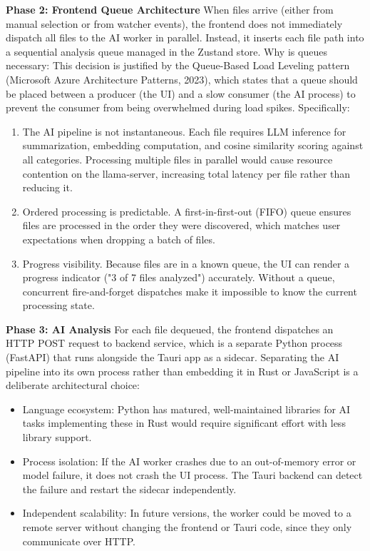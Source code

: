 \documentclass[12pt,oneside,openright,a4paper]{cpe-english-project}
\begin{document}
\textbf{Phase 2: Frontend Queue Architecture}
When files arrive (either from manual selection or from watcher events), the frontend does not immediately dispatch all files to the AI worker in parallel. Instead, it inserts each file path into a sequential analysis queue managed in the Zustand store.
Why is queues necessary:
This decision is justified by the Queue-Based Load Leveling pattern (Microsoft Azure Architecture Patterns, 2023), which states that a queue should be placed between a producer (the UI) and a slow consumer (the AI process) to prevent the consumer from being overwhelmed during load spikes. Specifically:
\begin{enumerate}[label=\arabic*.,leftmargin=0.6in]
\item The AI pipeline is not instantaneous. Each file requires LLM inference for summarization, embedding computation, and cosine similarity scoring against all categories. Processing multiple files in parallel would cause resource contention on the llama-server, increasing total latency per file rather than reducing it.
\item Ordered processing is predictable. A first-in-first-out (FIFO) queue ensures files are processed in the order they were discovered, which matches user expectations when dropping a batch of files.
\item Progress visibility. Because files are in a known queue, the UI can render a progress indicator ("3 of 7 files analyzed") accurately. Without a queue, concurrent fire-and-forget dispatches make it impossible to know the current processing state.
\end{enumerate}

\textbf{Phase 3: AI Analysis}
For each file dequeued, the frontend dispatches an HTTP POST request to backend service, which is a separate Python process (FastAPI) that runs alongside the Tauri app as a sidecar. Separating the AI pipeline into its own process rather than embedding it in Rust or JavaScript is a deliberate architectural choice:
\begin{itemize}
\item Language ecosystem: Python has matured, well-maintained libraries for AI tasks implementing these in Rust would require significant effort with less library support.
\item Process isolation: If the AI worker crashes due to an out-of-memory error or model failure, it does not crash the UI process. The Tauri backend can detect the failure and restart the sidecar independently.
\item Independent scalability: In future versions, the worker could be moved to a remote server without changing the frontend or Tauri code, since they only communicate over HTTP.
\end{itemize}
\end{document}
